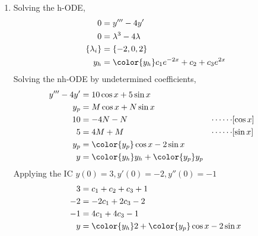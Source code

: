 \begin{enumerate}
    \item Solving the h-ODE,
          \begin{align}
              0               & = y''' - 4y'                                 \\
              0               & = \lambda^{3} - 4\lambda                     \\
              \{\lambda_{i}\} & = \{-2, 0, 2\}                               \\
              y_{h}           & = \color{y_h} c_1 e^{-2x} + c_2 + c_3 e^{2x}
          \end{align}
          Solving the nh-ODE by undetermined coefficients,
          \begin{align}
              y''' - 4y'   & = 10\cos x + 5\sin x                          \\
              y_{p}        & = M\cos x + N\sin x                           \\
              10           & = -4N - N                                   &
              \cdots\cdots & [\cos x]                                      \\
              5            & = 4M + M                                    &
              \cdots\cdots & [\sin x]                                      \\
              y_{p}        & = \color{y_p} \cos x - 2\sin x                \\
              y            & = {\color{y_h} y_{h}} + {\color{y_p} y_{p}}
          \end{align}
          Applying the IC $ y(0) = 3, y'(0) = -2, y''(0) = -1 $
          \begin{align}
              3  & = c_1 + c_2 + c_3 + 1                               \\
              -2 & = -2c_1 + 2c_3 - 2                                  \\
              -1 & = 4c_1 + 4c_3 - 1                                   \\
              y  & = {\color{y_h} 2} + {\color{y_p} \cos x - 2 \sin x}
          \end{align}
          \begin{figure}[H]
              \centering
          \end{figure}


\end{enumerate}
